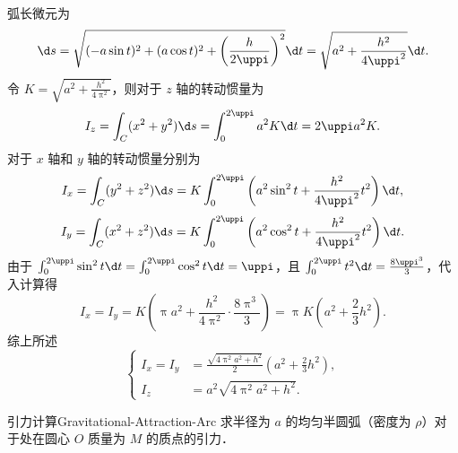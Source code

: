 \begin{solution}
    弧长微元为
    \begin{equation}
        \d s = \sqrt{(-a \sin t)^2 + (a \cos t)^2 + \left(\frac{h}{2\uppi}\right)^2} \d t = \sqrt{a^2 + \frac{h^2}{4\uppi^2}} \d t.
    \end{equation}
    令 $K = \sqrt{a^2 + \frac{h^2}{4\uppi^2}}$，则对于 $z$ 轴的转动惯量为
    \begin{equation}
        I_z = \int_{C} (x^2 + y^2) \d s = \int_{0}^{2\uppi} a^2 K \d t = 2\uppi a^2 K.
    \end{equation}
    对于 $x$ 轴和 $y$ 轴的转动惯量分别为
    \begin{equation}
        I_x = \int_{C} (y^2 + z^2) \d s = K \int_{0}^{2\uppi} \left( a^2 \sin^2 t + \frac{h^2}{4\uppi^2} t^2 \right) \d t,
    \end{equation}
    \begin{equation}
        I_y = \int_{C} (x^2 + z^2) \d s = K \int_{0}^{2\uppi} \left( a^2 \cos^2 t + \frac{h^2}{4\uppi^2} t^2 \right) \d t.
    \end{equation}
    由于 $\int_{0}^{2\uppi} \sin^2 t \d t = \int_{0}^{2\uppi} \cos^2 t \d t = \uppi$，且 $\int_{0}^{2\uppi} t^2 \d t = \frac{8\uppi^3}{3}$，代入计算得
    \begin{equation}
        I_x = I_y = K \left( \uppi a^2 + \frac{h^2}{4\uppi^2} \cdot \frac{8\uppi^3}{3} \right) = \uppi K \left( a^2 + \frac{2}{3}h^2 \right).
    \end{equation}
    综上所述
    \begin{equation}
        \boxed{\left\{ \begin{aligned} I_x = I_y &= \frac{\sqrt{4\uppi^2 a^2 + h^2}}{2} \left( a^2 + \frac{2}{3}h^2 \right), \\ I_z &= a^2 \sqrt{4\uppi^2 a^2 + h^2}. \end{aligned} \right.}
    \end{equation}
\end{solution}

\begin{problem}{引力计算}{Gravitational-Attraction-Arc}
    求半径为 $a$ 的均匀半圆弧（密度为 $\rho$）对于处在圆心 $O$ 质量为 $M$ 的质点的引力．
\end{problem}

